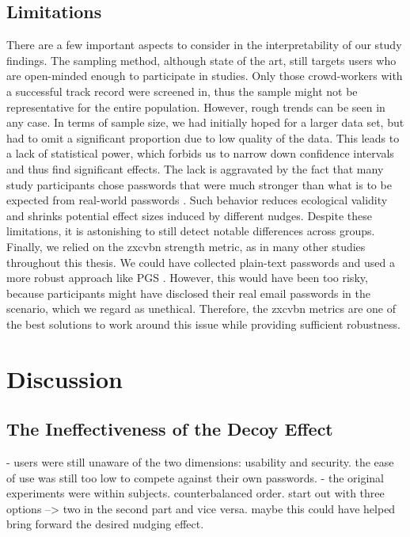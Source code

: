 \subsection{Limitations}
There are a few important aspects to consider in the interpretability of our study findings. The sampling method, although state of the art, still targets users who are open-minded enough to participate in studies. Only those crowd-workers with a successful track record were screened in, thus the sample might not be representative for the entire population. However, rough trends can be seen in any case. In terms of sample size, we had initially hoped for a larger data set, but had to omit a significant proportion due to low quality of the data. This leads to a lack of statistical power, which forbids us to narrow down confidence intervals and thus find significant effects. The lack is aggravated by the fact that many study participants chose passwords that were much stronger than what is to be expected from real-world passwords \cite{Mazurek2013Measuring}. Such behavior reduces ecological validity and shrinks potential effect sizes induced by different nudges. Despite these limitations, it is astonishing to still detect notable differences across groups. Finally, we relied on the zxcvbn strength metric, as in many other studies throughout this thesis. We could have collected plain-text passwords and used a more robust approach like PGS \cite{Ur2015MeasuringRealWorldAccuracies}. However, this would have been too risky, because participants might have disclosed their real email passwords in the scenario, which we regard as unethical. Therefore, the zxcvbn metrics are one of the best solutions to work around this issue while providing sufficient robustness.

\section{Discussion}

\subsection{The Ineffectiveness of the Decoy Effect}
- users were still unaware of the two dimensions: usability and security. the ease of use was still too low to compete against their own passwords. 
- the original experiments were within subjects. counterbalanced order. start out with three options --> two in the second part and vice versa. maybe this could have helped bring forward the desired nudging effect. 

